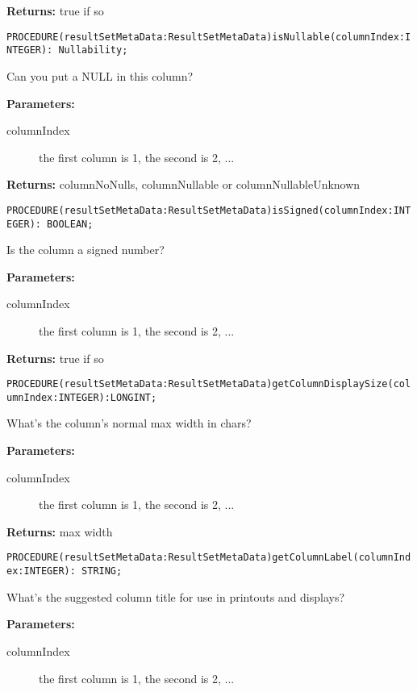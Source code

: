 {\bf Returns: } 
true if so 



\verb'PROCEDURE(resultSetMetaData:ResultSetMetaData)isNullable(columnIndex:INTEGER): Nullability;'

Can you put a NULL in this column? 

{\bf Parameters: }
\begin{description}
\item[columnIndex] the first column is 1, the second is 2, ... 
\end{description}

{\bf Returns: } 
columnNoNulls, columnNullable or columnNullableUnknown 



\verb'PROCEDURE(resultSetMetaData:ResultSetMetaData)isSigned(columnIndex:INTEGER): BOOLEAN;'

Is the column a signed number? 

{\bf Parameters: }
\begin{description}
\item[columnIndex] the first column is 1, the second is 2, ... 
\end{description}

{\bf Returns: } 
true if so 



\verb'PROCEDURE(resultSetMetaData:ResultSetMetaData)getColumnDisplaySize(columnIndex:INTEGER):LONGINT;'

What's the column's normal max width in chars? 


{\bf Parameters: }
\begin{description}
\item[columnIndex] the first column is 1, the second is 2, ... 
\end{description}

{\bf Returns: } 
max width 



\verb'PROCEDURE(resultSetMetaData:ResultSetMetaData)getColumnLabel(columnIndex:INTEGER): STRING;'

What's the suggested column title for use in printouts and displays? 

{\bf Parameters: }
\begin{description}
\item[columnIndex] the first column is 1, the second is 2, ... 
\end{description}

